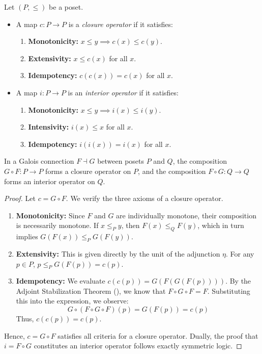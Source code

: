 \begin{definition}
Let $(P, \leq)$ be a poset.
\begin{itemize}
    \item A map $c: P \to P$ is a \emph{closure operator} if it satisfies:
    \begin{enumerate}
        \item \textbf{Monotonicity:} $x \leq y \implies c(x) \leq c(y)$.
        \item \textbf{Extensivity:} $x \leq c(x)$ for all $x$.
        \item \textbf{Idempotency:} $c(c(x)) = c(x)$ for all $x$.
    \end{enumerate}
    \item A map $i: P \to P$ is an \emph{interior operator} if it satisfies:
    \begin{enumerate}
        \item \textbf{Monotonicity:} $x \leq y \implies i(x) \leq i(y)$.
        \item \textbf{Intensivity:} $i(x) \leq x$ for all $x$.
        \item \textbf{Idempotency:} $i(i(x)) = i(x)$ for all $x$.
    \end{enumerate}
\end{itemize}
\end{definition}

\begin{theorem}
\label{thm:adj_closure}
In a Galois connection $F \dashv G$ between posets $P$ and $Q$, the composition $G \circ F: P \to P$ forms a closure operator on $P$, and the composition $F \circ G: Q \to Q$ forms an interior operator on $Q$.
\end{theorem}
\begin{proof}
Let $c = G \circ F$. We verify the three axioms of a closure operator.
\begin{enumerate}
    \item \textbf{Monotonicity:} Since $F$ and $G$ are individually monotone, their composition is necessarily monotone. If $x \leq_P y$, then $F(x) \leq_Q F(y)$, which in turn implies $G(F(x)) \leq_P G(F(y))$.
    \item \textbf{Extensivity:} This is given directly by the unit of the adjunction $\eta$. For any $p \in P$, $p \leq_P G(F(p)) = c(p)$.
    \item \textbf{Idempotency:} We evaluate $c(c(p)) = G(F(G(F(p))))$. By the Adjoint Stabilization Theorem (), we know that $F \circ G \circ F = F$. Substituting this into the expression, we observe:
    \[ G \circ (F \circ G \circ F)(p) = G(F(p)) = c(p) \]
    Thus, $c(c(p)) = c(p)$.
\end{enumerate}
Hence, $c = G \circ F$ satisfies all criteria for a closure operator. Dually, the proof that $i = F \circ G$ constitutes an interior operator follows exactly symmetric logic.
\end{proof}

